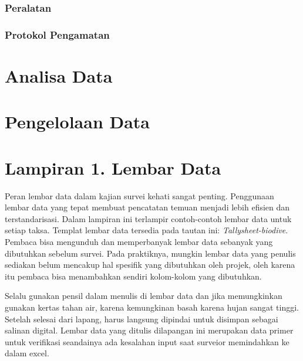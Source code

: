 \documentclass[
]{book}
\begin{document}
\hypertarget{peralatan-3}{%
\subsection*{Peralatan}\label{peralatan-3}}

\hypertarget{protokol-pengamatan-3}{%
\subsection*{Protokol Pengamatan}\label{protokol-pengamatan-3}}

\hypertarget{analisa-data}{%
\chapter*{Analisa Data}\label{analisa-data}}

\hypertarget{pengelolaan-data}{%
\chapter*{Pengelolaan Data}\label{pengelolaan-data}}

\hypertarget{lampiran-1.-lembar-data}{%
\chapter*{Lampiran 1. Lembar Data}\label{lampiran-1.-lembar-data}}

Peran lembar data dalam kajian survei kehati sangat penting. Penggunaan lembar data yang tepat membuat pencatatan temuan menjadi lebih efisien dan terstandarisasi. Dalam lampiran ini terlampir contoh-contoh lembar data untuk setiap taksa. Templat lembar data tersedia pada tautan ini: \emph{Tallysheet-biodive}. Pembaca bisa mengunduh dan memperbanyak lembar data sebanyak yang dibutuhkan sebelum survei. Pada praktiknya, mungkin lembar data yang penulis sediakan belum mencakup hal spesifik yang dibutuhkan oleh projek, oleh karena itu pembaca bisa menambahkan sendiri kolom-kolom yang dibutuhkan.

Selalu gunakan pensil dalam menulis di lembar data dan jika memungkinkan gunakan kertas tahan air, karena kemungkinan basah karena hujan sangat tinggi. Setelah selesai dari lapang, harus langsung dipindai untuk disimpan sebagai salinan digital. Lembar data yang ditulis dilapangan ini merupakan data primer untuk verifikasi seandainya ada kesalahan input saat surveior memindahkan ke dalam excel.
\end{document}
